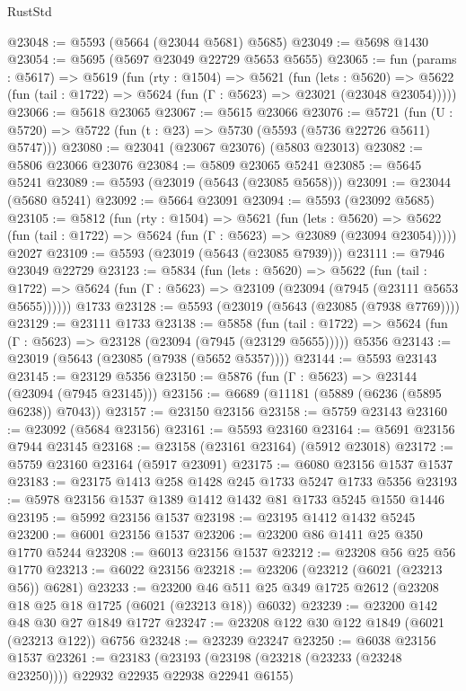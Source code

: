 \begin{lexlean}{RustStd}
\begin{coremodule}
@23048 := @5593 (@5664 (@23044 @5681) @5685)
@23049 := @5698 @1430
@23054 := @5695 (@5697 @23049 @22729 @5653 @5655)
@23065 := fun (params : @5617) =>
  @5619
    (fun (rty : @1504) =>
    @5621
      (fun (lets : @5620) =>
      @5622 (fun (tail : @1722) => @5624 (fun (Γ : @5623) => @23021 (@23048 @23054)))))
@23066 := @5618 @23065
@23067 := @5615 @23066
@23076 := @5721
    (fun (U : @5720) => @5722 (fun (t : @23) => @5730 (@5593 (@5736 @22726 @5611) @5747)))
@23080 := @23041 (@23067 @23076) (@5803 @23013)
@23082 := @5806 @23066 @23076
@23084 := @5809 @23065 @5241
@23085 := @5645 @5241
@23089 := @5593 (@23019 (@5643 (@23085 @5658)))
@23091 := @23044 (@5680 @5241)
@23092 := @5664 @23091
@23094 := @5593 (@23092 @5685)
@23105 := @5812
    (fun (rty : @1504) =>
    @5621
      (fun (lets : @5620) =>
      @5622 (fun (tail : @1722) => @5624 (fun (Γ : @5623) => @23089 (@23094 @23054)))))
    @2027
@23109 := @5593 (@23019 (@5643 (@23085 @7939)))
@23111 := @7946 @23049 @22729
@23123 := @5834
    (fun (lets : @5620) =>
    @5622
      (fun (tail : @1722) =>
      @5624 (fun (Γ : @5623) => @23109 (@23094 (@7945 (@23111 @5653 @5655))))))
    @1733
@23128 := @5593 (@23019 (@5643 (@23085 (@7938 @7769))))
@23129 := @23111 @1733
@23138 := @5858
    (fun (tail : @1722) => @5624 (fun (Γ : @5623) => @23128 (@23094 (@7945 (@23129 @5655)))))
    @5356
@23143 := @23019 (@5643 (@23085 (@7938 (@5652 @5357))))
@23144 := @5593 @23143
@23145 := @23129 @5356
@23150 := @5876 (fun (Γ : @5623) => @23144 (@23094 (@7945 @23145)))
@23156 := @6689 (@11181 (@5889 (@6236 (@5895 @6238)) @7043))
@23157 := @23150 @23156
@23158 := @5759 @23143
@23160 := @23092 (@5684 @23156)
@23161 := @5593 @23160
@23164 := @5691 @23156 @7944 @23145
@23168 := @23158 (@23161 @23164) (@5912 @23018)
@23172 := @5759 @23160 @23164 (@5917 @23091)
@23175 := @6080 @23156 @1537 @1537
@23183 := @23175 @1413 @258 @1428 @245 @1733 @5247 @1733 @5356
@23193 := @5978 @23156 @1537 @1389 @1412 @1432 @81 @1733 @5245 @1550 @1446
@23195 := @5992 @23156 @1537
@23198 := @23195 @1412 @1432 @5245
@23200 := @6001 @23156 @1537
@23206 := @23200 @86 @1411 @25 @350 @1770 @5244
@23208 := @6013 @23156 @1537
@23212 := @23208 @56 @25 @56 @1770
@23213 := @6022 @23156
@23218 := @23206 (@23212 (@6021 (@23213 @56)) @6281)
@23233 := @23200 @46 @511 @25 @349 @1725 @2612 (@23208 @18 @25 @18 @1725 (@6021 (@23213 @18)) @6032)
@23239 := @23200 @142 @48 @30 @27 @1849 @1727
@23247 := @23208 @122 @30 @122 @1849 (@6021 (@23213 @122)) @6756
@23248 := @23239 @23247
@23250 := @6038 @23156 @1537
@23261 := @23183
    (@23193 (@23198 (@23218 (@23233 (@23248 @23250)))) @22932 @22935 @22938 @22941 @6155)

\end{coremodule}
\end{lexlean}
